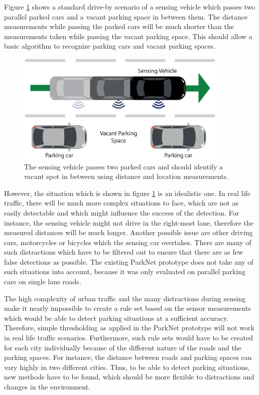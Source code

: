 Figure \ref{fig:driveby_standard_parking_situation} shows a standard drive-by scenario of a sensing vehicle which passes two parallel parked cars and a vacant parking space in between them. The distance measurements while passing the parked cars will be much shorter than the measurements taken while passing the vacant parking space. This should allow a basic algorithm to recognize parking cars and vacant parking spaces.

\begin{figure}
	\centering
	\includegraphics[width=0.9\textwidth]{img/drive-by-parking-situation-pictogram.eps}
	\caption{The sensing vehicle passes two parked cars and should identify a vacant spot in between using distance and location measurements. }
	\label{fig:driveby_standard_parking_situation}
\end{figure}

However, the situation which is shown in figure \ref{fig:driveby_standard_parking_situation} is an idealistic one. In real life traffic, there will be much more complex situations to face, which are not as easily detectable and which might influence the success of the detection. For instance, the sensing vehicle might not drive in the right-most lane, therefore the measured distances will be much longer. Another possible issue are other driving cars, motorcycles or bicycles which the sensing car overtakes. There are many of such distractions which have to be filtered out to ensure that there are as few false detections as possible. 
The existing ParkNet prototype does not take any of such situations into account, because it was only evaluated on parallel parking cars on single lane roads.

The high complexity of urban traffic and the many distractions during sensing make it nearly impossible to create a rule set based on the sensor measurements which would be able to detect parking situations at a sufficient accuracy. Therefore, simple thresholding as applied in the ParkNet prototype will not work in real life traffic scenarios. Furthermore, such rule sets would have to be created for each city individually because of the different nature of the roads and the parking spaces. For instance, the distance between roads and parking spaces can vary highly in two different cities. Thus, to be able to detect parking situations, new methods have to be found, which should be more flexible to distractions and changes in the environment.

